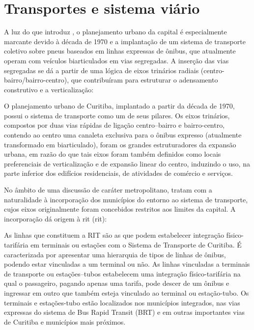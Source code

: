 	\section{Transportes e sistema viário}
	
	A luz do que introduz , o planejamento urbano da capital é especialmente marcante devido à década de 1970 e a implantação de um sistema de transporte coletivo sobre pneus baseados em linhas expressas de ônibus, que atualmente operam com veículos biarticulados em vias segregadas. A inserção das vias segregadas se dá a partir de uma lógica de eixos trinários radiais (centro-bairro/bairro-centro), que contribuíram para estruturar o adensamento construtivo e a verticalização:
	
	\begin{citacao}
		O planejamento urbano de Curitiba, implantado a partir da década de 1970, possui o sistema de transporte como um de seus pilares. Os eixos trinários, compostos por duas vias rápidas de ligação centro--bairro e bairro-centro, contendo ao centro uma canaleta exclusiva para o ônibus expresso (atualmente transformado em biarticulado), foram os grandes estruturadores da expansão urbana, em razão do que tais eixos foram também definidos como locais preferenciais de verticalização e de expansão linear do centro, induzindo o uso, na parte inferior dos edifícios residenciais, de atividades de comércio e serviços.
	\end{citacao}

	No âmbito de uma discussão de caráter metropolitano,  tratam com a naturalidade à incorporação dos municípios do entorno ao sistema de transporte, cujos eixos originalmente foram concebidos restritos aos limites da capital. A incorporação dá origem à \glsdesc{rit} (\gls{rit}):
	
	\begin{citacao}
		As linhas que constituem a RIT são as que podem estabelecer integração físico-tarifária em terminais ou estações com o Sistema de Transporte de Curitiba. É caracterizada por apresentar uma hierarquia de tipos de linhas de ônibus, podendo estar vinculadas a um terminal ou não. As linhas vinculadas a terminais de transporte ou estações--tubos estabelecem uma integração físico-tarifária na qual o passageiro, pagando apenas uma tarifa, pode descer de um ônibus e ingressar em outro que também esteja vinculado ao terminal ou estação-tubo. Os terminais e estações-tubo estão localizados nos municípios integrados, nas vias expressas do sistema de Bus Rapid Transit (BRT) e em outras importantes vias de Curitiba e municípios mais próximos. \cite[p. 376]{paese2014a}
	\end{citacao}
	
